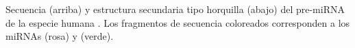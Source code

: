 \label{horquilla}
Secuencia (arriba) y estructura secundaria tipo horquilla (abajo) del
pre-miRNA de la especie humana .  Los fragmentos de
secuencia coloreados corresponden a los miRNAs 
(rosa) y  (verde).
